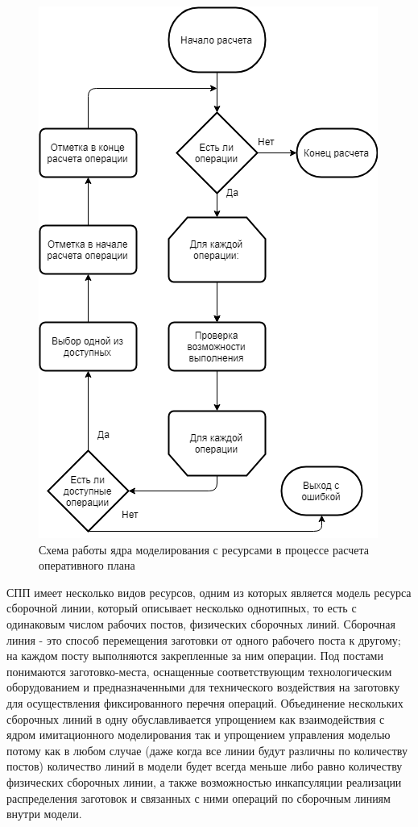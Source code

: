 \begin{figure}[h]
	\includegraphics[scale=0.7]{pics/assemblyResSchema.png}
	\caption{Схема работы ядра моделирования с ресурсами в процессе расчета оперативного плана}
	\label{fig:assemblyResSchema}
	\centering
\end{figure}

\indent СПП имеет несколько видов ресурсов, одним из которых является модель ресурса сборочной линии, который описывает несколько однотипных, то есть с одинаковым числом рабочих постов, физических сборочных линий.
Сборочная линия - это способ перемещения заготовки от одного рабочего поста к другому; на каждом посту выполняются закрепленные за ним операции.
Под постами понимаются заготовко-места, оснащенные соответствующим технологическим оборудованием и предназначенными для технического воздействия на заготовку для осуществления фиксированного перечня операций.
Объединение нескольких сборочных линий в одну обуславливается упрощением как взаимодействия с ядром имитационного моделирования так и упрощением управления моделью потому как в любом случае (даже когда все линии будут различны по количеству постов) количество линий в модели будет всегда меньше либо равно количеству физических сборочных линии, а также возможностью инкапсуляции реализации распределения заготовок и связанных с ними операций по сборочным линиям внутри модели.

